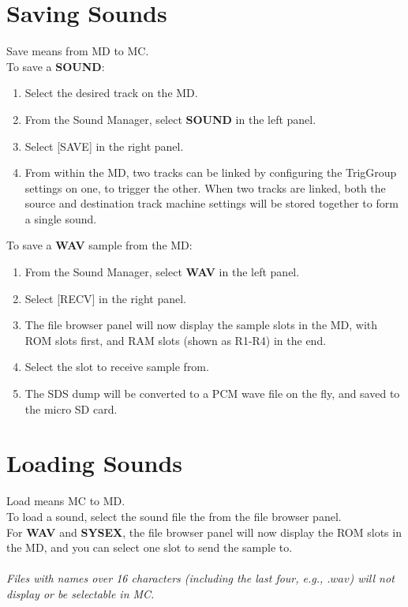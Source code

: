\section{Saving Sounds}
Save means from MD to MC.\\
To save a \textbf{SOUND}:
\begin{enumerate}
 \item Select the desired track on the MD.
 \item From the Sound Manager, select \textbf{SOUND} in the left panel.
 \item Select [SAVE] in the right panel.
 \item From within the MD, two tracks can be linked by configuring the TrigGroup settings on one, to trigger the other. When two tracks are linked, both the source and destination track machine settings will be stored together to form a single sound.
\end{enumerate}
To save a \textbf{WAV} sample from the MD:
\begin{enumerate}
    \item From the Sound Manager, select \textbf{WAV} in the left panel.
    \item Select [RECV] in the right panel.
    \item The file browser panel will now display the sample slots in the MD, with ROM slots first, and RAM slots (shown as R1-R4) in the end.
    \item Select the slot to receive sample from.
    \item The SDS dump will be converted to a PCM wave file on the fly, and saved to the micro SD card.
\end{enumerate}

\section{Loading Sounds}
Load means MC to MD.\\
To load a sound, select the sound file the from the file browser panel.\\
For \textbf{WAV} and \textbf{SYSEX}, the file browser panel will now display the ROM slots in the MD, and you can select one slot to send the sample to.
\\
\\
\textit{Files with names over 16 characters (including the last four, e.g., $.wav$) will not display or be selectable in MC.}
\\
